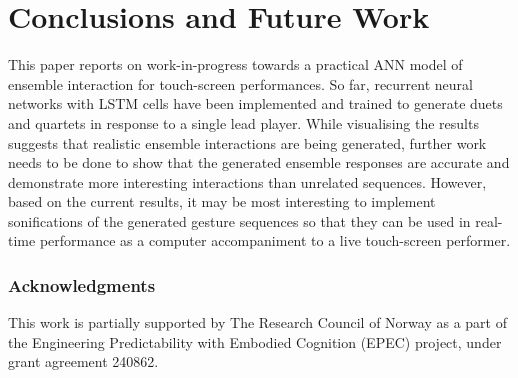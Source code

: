 \documentclass{article}
\begin{document}
\section{Conclusions and Future Work}

This paper reports on work-in-progress towards a practical ANN model
of ensemble interaction for touch-screen performances. So far,
recurrent neural networks with LSTM cells have been implemented and
trained to generate duets and quartets in response to a single lead
player. While visualising the results suggests that realistic ensemble
interactions are being generated, further work needs to be done to
show that the generated ensemble responses are accurate and demonstrate more
interesting interactions than unrelated sequences. However, based on
the current results, it may be most interesting to implement
sonifications of the generated gesture sequences so that they can be
used in real-time performance as a computer accompaniment to a live
touch-screen performer.

\subsubsection*{Acknowledgments}
This work is partially supported by The Research Council of Norway as
a part of the Engineering Predictability with Embodied Cognition
(EPEC) project, under grant agreement 240862.



\end{document}
